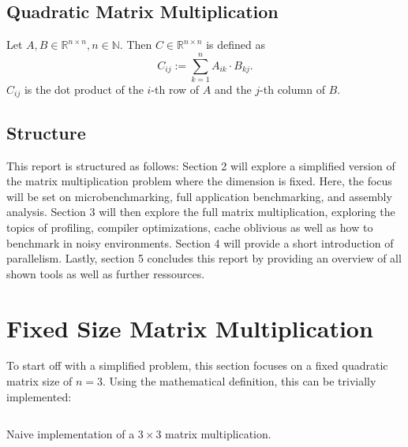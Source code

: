 \subsection{Quadratic Matrix Multiplication}

Let $A, B \in \mathbb{R}^{n\times n}, n \in \mathbb{N}$. Then $C \in \mathbb{R}^{n \times n}$ is defined as
\[
  C_{ij} := \sum_{k=1}^n A_{ik} \cdot B_{kj}.
\]
$C_{ij}$ is the dot product of the $i$-th row of $A$ and the $j$-th column of $B$.

\subsection{Structure}
This report is structured as follows: Section 2 will explore a simplified version of the matrix multiplication problem where the dimension is fixed. Here, the focus will be set on microbenchmarking, full application benchmarking, and assembly analysis. Section 3 will then explore the full matrix multiplication, exploring the topics of profiling, compiler optimizations, cache oblivious as well as how to benchmark in noisy environments. Section 4 will provide a short introduction of parallelism. Lastly, section 5 concludes this report by providing an overview of all shown tools as well as further ressources.

\section{Fixed Size Matrix Multiplication}
To start off with a simplified problem, this section focuses on a fixed quadratic matrix size of $n=3$. Using the mathematical definition, this can be trivially implemented:

\begin{listing}[th]
  \inputminted{rust}{./assets/first_impl.rs}
\caption{Naive implementation of a $3\times3$ matrix multiplication.}
\label{lst:hello}
\end{listing}


